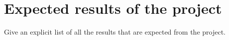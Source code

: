 \chapter[Expected results]{Expected results of the project}
Give an explicit list of all the results that are expected from the project. 

\lipsum[16]
